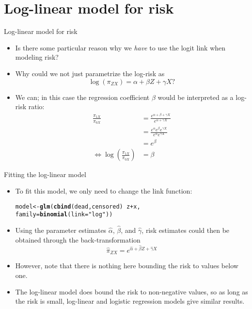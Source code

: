 \documentclass[10pt]{beamer}\usepackage[]{graphicx}\usepackage[]{color}
\makeatletter
\newcommand{\hlstr}[1]{\textcolor[rgb]{0.192,0.494,0.8}{#1}}%
\newcommand{\hlopt}[1]{\textcolor[rgb]{0,0,0}{#1}}%
\newcommand{\hlstd}[1]{\textcolor[rgb]{0.345,0.345,0.345}{#1}}%
\newcommand{\hlkwb}[1]{\textcolor[rgb]{0.69,0.353,0.396}{#1}}%
\newcommand{\hlkwc}[1]{\textcolor[rgb]{0.333,0.667,0.333}{#1}}%
\newcommand{\hlkwd}[1]{\textcolor[rgb]{0.737,0.353,0.396}{\textbf{#1}}}%
\newenvironment{kframe}{%
 \def\at@end@of@kframe{}%
 \ifinner\ifhmode%
  \def\at@end@of@kframe{\end{minipage}}%
  \begin{minipage}{\columnwidth}%
 \fi\fi%
 \def\FrameCommand##1{\hskip\@totalleftmargin \hskip-\fboxsep
 \colorbox{shadecolor}{##1}\hskip-\fboxsep
     \hskip-\linewidth \hskip-\@totalleftmargin \hskip\columnwidth}%
 \MakeFramed {\advance\hsize-\width
   \@totalleftmargin\z@ \linewidth\hsize
   \@setminipage}}%
 {\par\unskip\endMakeFramed%
 \at@end@of@kframe}
\newenvironment{knitrout}{}{} %
\makeatother
\begin{document}
\section{Log-linear model for risk}

\begin{frame}[fragile]{Log-linear model for risk}
	\begin{itemize}
		\item Is there some particular reason why we \textit{have} to use the logit link when modeling risk?
		\item Why could we not just parametrize the log-risk as
		$$
		\log(\pi_{ZX}) = \alpha + \beta Z + \gamma X ?
		$$
		\pause 
		\item We can; in this case the regression coefficient $\beta$ would be interpreted as a log-risk ratio:
$$\begin{aligned}
	\frac{\pi_{1 X}}{\pi_{0 X}} &=\frac{e^{\alpha+\beta+\gamma X}}{e^{\alpha+\gamma X}} \\
	&=\frac{e^{\alpha} e^{\beta} e^{\gamma X}}{e^{\alpha} e^{\gamma X}} \\
	&=e^{\beta} \\
	\Leftrightarrow \log \left(\frac{\pi_{1 X}}{\pi_{0 X}}\right) &=\beta
\end{aligned}$$
	\end{itemize}
\end{frame}




\begin{frame}[fragile]{Fitting the log-linear model}
\begin{itemize}
	\item To fit this model, we only need to change the link
	function:
\begin{knitrout}
\color{fgcolor}\begin{kframe}
\begin{alltt}
        \hlstd{model} \hlkwb{<-} \hlkwd{glm}\hlstd{(}\hlkwd{cbind}\hlstd{(dead,censored)} \hlopt{~} \hlstd{z} \hlopt{+} \hlstd{x,}
                     \hlkwc{family}\hlstd{=}\hlkwd{binomial}\hlstd{(}\hlkwc{link}\hlstd{=}\hlstr{"log"}\hlstd{))}
\end{alltt}
\end{kframe}
\end{knitrout}
	\item Using the parameter estimates $\hat{\alpha}$, $\hat{\beta}$, and $\hat{\gamma}$, risk estimates could then be obtained through the back-transformation
	$$
	\hat{\pi}_{ZX} = e^{\hat{\alpha} + \hat{\beta} Z + \hat{\gamma} X}
	$$
	\item However, note that there is nothing here bounding the risk
	to values below one.
	\item The log-linear model does bound the risk to non-negative
	values, so as long as the risk is small, log-linear and
	logistic regression models give similar results.
\end{itemize}
\end{frame}
\end{document}
